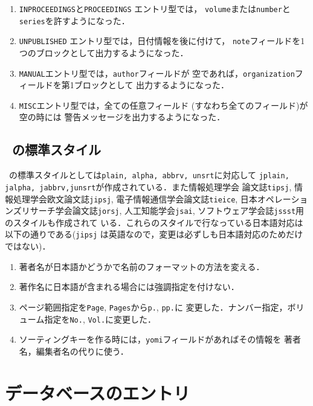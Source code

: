 \begin{enumerate}
\item
{\tt INPROCEEDINGS}と{\tt PROCEEDINGS}
エントリ型では，
{\tt volume}または{\tt number}と
{\tt series}を許すようになった．

\item
{\tt UNPUBLISHED} エントリ型では，日付情報を後に付けて，
{\tt note}フィールドを1つのブロックとして出力するようになった．

\item
{\tt MANUAL}エントリ型では，{\tt author}フィールドが
空であれば，{\tt organization}フィールドを第1ブロックとして
出力するようになった．

\item
{\tt MISC}エントリ型では，全ての任意フィールド
(すなわち全てのフィールド)が空の時には
警告メッセージを出力するようになった．

\end{enumerate}

\subsection{\JBibTeX\ の標準スタイル}

\JBibTeX\ の標準スタイルとしては{\tt plain, alpha, abbrv, unsrt}に対応して
{\tt jplain, jalpha, jabbrv,\linebreak junsrt}が作成されている．また情報処理学会
論文誌{\tt tipsj}, 情報処理学会欧文論文誌{\tt jipsj}, 電子情報通信学会論文誌{\tt tieice}, 
日本オペレーションズリサーチ学会論文誌{\tt jorsj},
人工知能学会{\tt jsai}, ソフトウェア学会誌{\tt jssst}用のスタイルも作成されて
いる．これらのスタイルで行なっている日本語対応は以下の通りである({\tt jipsj}
は英語なので，変更は必ずしも日本語対応のためだけではない)．

\begin{enumerate}
\item 著者名が日本語かどうかで名前のフォーマットの方法を変える．

\item 著作名に日本語が含まれる場合には強調指定を付けない．

\item ページ範囲指定を{\tt Page}, {\tt Pages}から{\tt p.}, {\tt pp.}に
変更した．ナンバー指定，ボリューム指定を{\tt No.}, {\tt Vol.}に変更した．

\item ソーティングキーを作る時には，{\tt yomi}フィールドがあればその情報を
著者名，編集者名の代りに使う．
\end{enumerate}

\section{データベースのエントリ}
\label{latex-appendix}

